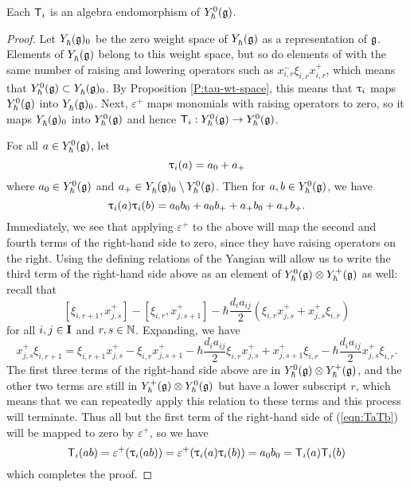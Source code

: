 \begin{lemma}\label{L:mbraid-hom}
    Each $\mbraid_i$ is an algebra endomorphism of $\Yhg[0]$.
\end{lemma}
\begin{proof}
    Let $\Yhg_0$ be the zero weight space of $\Yhg$ as a representation of $\g$.
    Elements of $\Yhg$ belong to this weight space, but so do elements of with the same number of raising and lowering operators such as $x^-_{i,r}\xi_{i,r}x^+_{i,r}$, which means that $\Yhg[0]\subset\Yhg_0$.
    By Proposition \ref{P:tau-wt-space}, this means that $\braid_i$ maps $\Yhg[0]$ into $\Yhg_0$.
    Next, $\varepsilon^+$ maps monomials with raising operators to zero, so it maps $\Yhg_0$ into $\Yhg[0]$ and hence $\mbraid_i:\Yhg[0]\to\Yhg[0]$.

    For all $a\in\Yhg[0]$, let
    \[\braid_i(a) = a_0+a_+\]
    where $a_0\in\Yhg[0]$ and $a_+\in\Yhg_0\setminus\Yhg[0]$.
    Then for $a,b\in\Yhg[0]$, we have
    \begin{equation}\label{eqn:TaTb}
        \braid_i(a)\braid_i(b) = a_0b_0 + a_0b_+ + a_+b_0 + a_+b_+.
    \end{equation}
    Immediately, we see that applying $\varepsilon^+$ to the above will map the second and fourth terms of the right-hand side to zero, since they have raising operators on the right.
    Using the defining relations of the Yangian will allow us to write the third term of the right-hand side above as an element of $\Yhg[0]\otimes\Yhg[+]$ as well: recall that
    \[[\xi_{i,r+1},x^+_{j,s}]-[\xi_{i,r},x^+_{j,s+1}]-\hbar\frac{d_ia_{ij}}{2}(\xi_{i,r}x^+_{j,s}+x^+_{j,s}\xi_{i,r})\]
    for all $i,j\in\I$ and $r,s\in\N$.
    Expanding, we have
    \[x^+_{j,s}\xi_{i,r+1}=\xi_{i,r+1}x^+_{j,s} -\xi_{i,r}x^+_{j,s+1} -\hbar\frac{d_ia_{ij}}{2}\xi_{i,r}x^+_{j,s} +x^+_{j,s+1}\xi_{i,r} -\hbar\frac{d_ia_{ij}}{2}x^+_{j,s}\xi_{i,r}.\]
    The first three terms of the right-hand side above are in $\Yhg[0]\otimes\Yhg[+]$, and the other two terms are still in $\Yhg[+]\otimes\Yhg[0]$ but have a lower subscript $r$, which means that we can repeatedly apply this relation to these terms and this process will terminate.
    Thus all but the first term of the right-hand side of (\ref{eqn:TaTb}) will be mapped to zero by $\varepsilon^+$, so we have
    \[\mbraid_i(ab) = \varepsilon^+(\braid_i(ab)) = \varepsilon^+(\braid_i(a)\braid_i(b)) = a_0b_0 = \mbraid_i(a)\mbraid_i(b)\]
    which completes the proof.
\end{proof}

